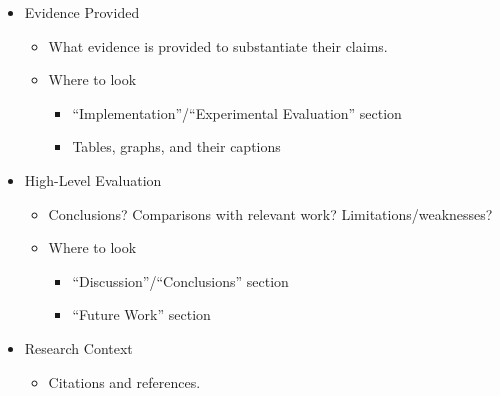 \documentclass{article}
\begin{document}
\begin{itemize}
\begin{itemize}
    \end{itemize}
    \item Evidence Provided
    \begin{itemize}
        \item What evidence is provided to substantiate their claims.
        \item Where to look
        \begin{itemize}
            \item ``Implementation''/``Experimental Evaluation'' section
            \item Tables, graphs, and their captions
        \end{itemize}
    \end{itemize}
    \item High-Level Evaluation
    \begin{itemize}
        \item Conclusions? Comparisons with relevant work? Limitations/weaknesses?
        \item Where to look
        \begin{itemize}
            \item ``Discussion''/``Conclusions'' section
            \item ``Future Work'' section
        \end{itemize}
    \end{itemize}
    \item Research Context
    \begin{itemize}
        \item Citations and references.
    \end{itemize}
\end{itemize}
\end{document}
